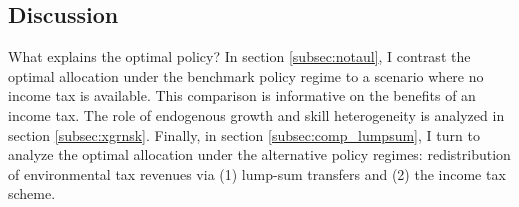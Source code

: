 %




\subsection{Discussion}\label{subsec:dis}

 What explains the optimal policy?
 In section \ref{subsec:notaul}, I contrast the optimal allocation under the benchmark policy regime to a scenario where no income tax is available.  This comparison is informative on the benefits of an income tax. The role of endogenous growth and skill heterogeneity is analyzed in section \ref{subsec:xgrnsk}.
Finally, in section \ref{subsec:comp_lumpsum}, I turn to analyze the optimal allocation under the alternative policy regimes: redistribution of environmental tax revenues via (1) lump-sum transfers and (2) the income tax scheme. 

